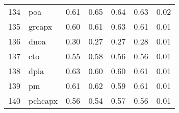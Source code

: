 \documentclass[12pt]{article}
\begin{document}
\begin{footnotesize}
\begin{longtable}{rl|c|c|c|c|c}
134 & poa              & 0.61                                                                                      & 0.65                                                                                        & 0.64                                                                                         & 0.63 & 0.02               \\
135 & grcapx           & 0.60                                                                                      & 0.61                                                                                        & 0.63                                                                                         & 0.61 & 0.01               \\
136 & dnoa             & 0.30                                                                                      & 0.27                                                                                        & 0.27                                                                                         & 0.28 & 0.01               \\
137 & cto              & 0.55                                                                                      & 0.58                                                                                        & 0.56                                                                                         & 0.56 & 0.01               \\
138 & dpia             & 0.63                                                                                      & 0.60                                                                                        & 0.60                                                                                         & 0.61 & 0.01               \\
139 & pm               & 0.61                                                                                      & 0.62                                                                                        & 0.59                                                                                         & 0.61 & 0.01               \\
140 & pchcapx          & 0.56                                                                                      & 0.54                                                                                        & 0.57                                                                                         & 0.56 & 0.01               \\

\end{longtable}
\end{footnotesize}
\end{document}
